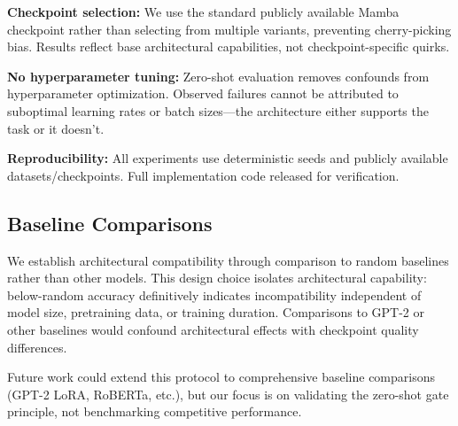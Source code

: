 \textbf{Checkpoint selection:} We use the standard publicly available Mamba checkpoint rather than selecting from multiple variants, preventing cherry-picking bias. Results reflect base architectural capabilities, not checkpoint-specific quirks.

\textbf{No hyperparameter tuning:} Zero-shot evaluation removes confounds from hyperparameter optimization. Observed failures cannot be attributed to suboptimal learning rates or batch sizes---the architecture either supports the task or it doesn't.

\textbf{Reproducibility:} All experiments use deterministic seeds and publicly available datasets/checkpoints. Full implementation code released for verification.

\subsection{Baseline Comparisons}

We establish architectural compatibility through comparison to random baselines rather than other models. This design choice isolates architectural capability: below-random accuracy definitively indicates incompatibility independent of model size, pretraining data, or training duration. Comparisons to GPT-2 or other baselines would confound architectural effects with checkpoint quality differences.

Future work could extend this protocol to comprehensive baseline comparisons (GPT-2 LoRA, RoBERTa, etc.), but our focus is on validating the zero-shot gate principle, not benchmarking competitive performance.

